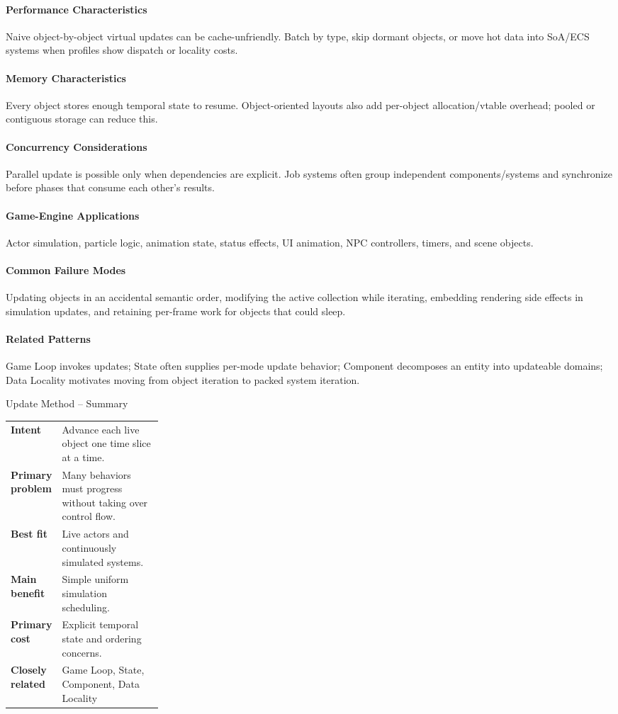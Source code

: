 \documentclass[11pt]{article}
\begin{document}
\paragraph{Performance Characteristics} Naive object-by-object virtual updates can be cache-unfriendly. Batch by type, skip dormant objects, or move hot data into SoA/ECS systems when profiles show dispatch or locality costs.
\paragraph{Memory Characteristics} Every object stores enough temporal state to resume. Object-oriented layouts also add per-object allocation/vtable overhead; pooled or contiguous storage can reduce this.
\paragraph{Concurrency Considerations} Parallel update is possible only when dependencies are explicit. Job systems often group independent components/systems and synchronize before phases that consume each other's results.
\paragraph{Game-Engine Applications} Actor simulation, particle logic, animation state, status effects, UI animation, NPC controllers, timers, and scene objects.
\paragraph{Common Failure Modes} Updating objects in an accidental semantic order, modifying the active collection while iterating, embedding rendering side effects in simulation updates, and retaining per-frame work for objects that could sleep.
\paragraph{Related Patterns} Game Loop invokes updates; State often supplies per-mode update behavior; Component decomposes an entity into updateable domains; Data Locality motivates moving from object iteration to packed system iteration.

\begin{patternsummary}{Update Method -- Summary}
\begin{tabularx}{\linewidth}{@{}>{\bfseries}p{0.25\linewidth}X@{}}
Intent & Advance each live object one time slice at a time. \\
Primary problem & Many behaviors must progress without taking over control flow. \\
Best fit & Live actors and continuously simulated systems. \\
Main benefit & Simple uniform simulation scheduling. \\
Primary cost & Explicit temporal state and ordering concerns. \\
Closely related & Game Loop, State, Component, Data Locality \\
\end{tabularx}
\end{patternsummary}
\end{document}
